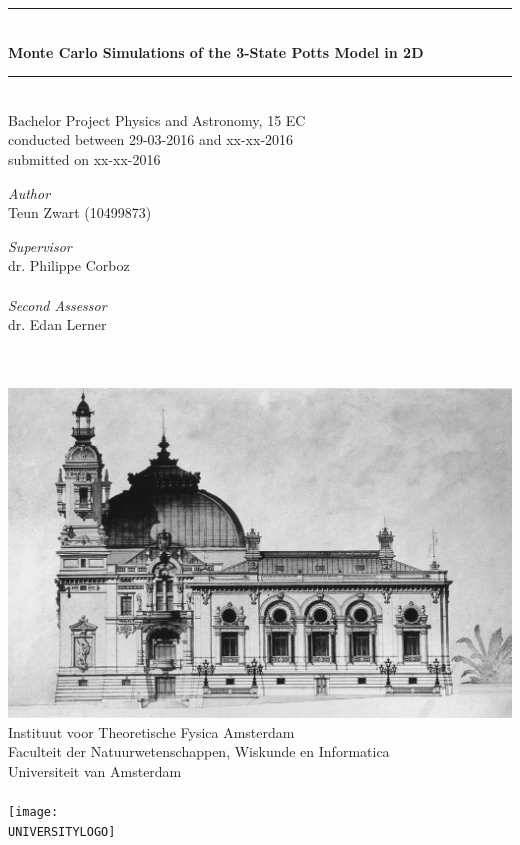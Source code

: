 \documentclass[11pt, a4paper]{report} %
\newcommand\TITLE{Monte Carlo Simulations of the 3-State Potts Model in 2D}
\newcommand\THESISFORM{Bachelor Project Physics and Astronomy, 15 EC\\conducted between 29-03-2016 and xx-xx-2016\\submitted on xx-xx-2016}
\newcommand\INSTITUTE{Instituut voor Theoretische Fysica Amsterdam}
\newcommand\FACULTY{Faculteit der Natuurwetenschappen, Wiskunde en Informatica}
\newcommand\UNIVERSITY{Universiteit van Amsterdam}
\newcommand\AUTHOR{Teun Zwart (10499873)}
\newcommand\SUPERVISOR{dr. Philippe Corboz}
\newcommand\SECONDASSESSOR{dr. Edan Lerner}
\newcommand\UNIVERSITYLOGO{UvA-logo.png} %
\begin{document}
\begin{titlepage}
	\begin{center}
		\rule{\textwidth}{0.4mm}\\[0.5cm]
		\huge{\textbf{\TITLE}}
		\rule{\textwidth}{0.4mm}\\[0.5cm]
		\large{\THESISFORM}\\[0.5cm]
		\begin{minipage}[t]{0.4\textwidth}
			\begin{flushleft}
				\large\emph{Author}\\{\AUTHOR}
			\end{flushleft}
		\end{minipage}
		\begin{minipage}[t]{0.4\textwidth}
			\begin{flushright}
				\large\emph{Supervisor}\\{\SUPERVISOR}\\~\\
				\large\emph{Second Assessor}\\{\SECONDASSESSOR}\\~\\~\\
			\end{flushright}
		\end{minipage}
		\includegraphics[width=\textwidth]{monte_carlo_casino.jpg}
		\vfill
		\large{\INSTITUTE}\\
		\large{\FACULTY}\\
		\large{\UNIVERSITY}\\~\\
		\texttt{[image: \\UNIVERSITYLOGO]}
	\end{center}
\end{titlepage}
\end{document}
